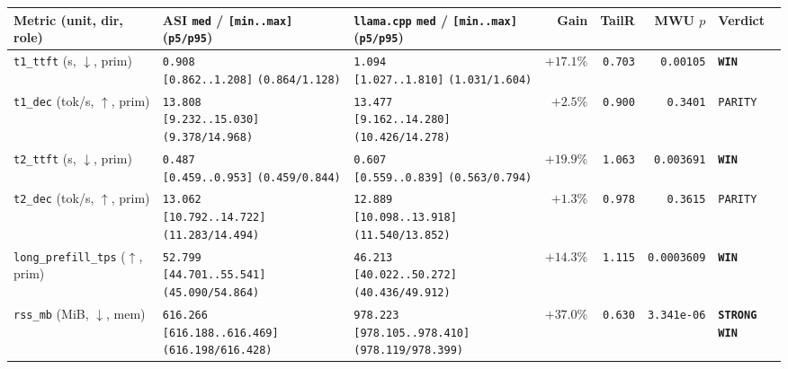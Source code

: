 \documentclass[11pt,a4paper]{article}
\begin{document}
\begin{table}[h]
\centering
\footnotesize
\setlength{\tabcolsep}{4pt}
\begin{tabular}{@{}lllrrrl@{}}
\toprule
Metric (unit, dir, role) & ASI \texttt{med} / \texttt{[min..max]} (\texttt{p5/p95}) & \texttt{llama.cpp} \texttt{med} / \texttt{[min..max]} (\texttt{p5/p95}) & Gain & TailR & MWU $p$ & Verdict \\
\midrule
\texttt{t1\_ttft} (s, $\downarrow$, prim) & \shortstack[l]{\texttt{0.908}\\\scriptsize\texttt{[0.862..1.208]} \texttt{(0.864/1.128)}} & \shortstack[l]{\texttt{1.094}\\\scriptsize\texttt{[1.027..1.810]} \texttt{(1.031/1.604)}} & $+17.1\%$ & \texttt{0.703} & \texttt{0.00105} & \textbf{\texttt{WIN}} \\
\texttt{t1\_dec} (tok/s, $\uparrow$, prim) & \shortstack[l]{\texttt{13.808}\\\scriptsize\texttt{[9.232..15.030]} \texttt{(9.378/14.968)}} & \shortstack[l]{\texttt{13.477}\\\scriptsize\texttt{[9.162..14.280]} \texttt{(10.426/14.278)}} & $+2.5\%$ & \texttt{0.900} & \texttt{0.3401} & \texttt{PARITY} \\
\texttt{t2\_ttft} (s, $\downarrow$, prim) & \shortstack[l]{\texttt{0.487}\\\scriptsize\texttt{[0.459..0.953]} \texttt{(0.459/0.844)}} & \shortstack[l]{\texttt{0.607}\\\scriptsize\texttt{[0.559..0.839]} \texttt{(0.563/0.794)}} & $+19.9\%$ & \texttt{1.063} & \texttt{0.003691} & \textbf{\texttt{WIN}} \\
\texttt{t2\_dec} (tok/s, $\uparrow$, prim) & \shortstack[l]{\texttt{13.062}\\\scriptsize\texttt{[10.792..14.722]} \texttt{(11.283/14.494)}} & \shortstack[l]{\texttt{12.889}\\\scriptsize\texttt{[10.098..13.918]} \texttt{(11.540/13.852)}} & $+1.3\%$ & \texttt{0.978} & \texttt{0.3615} & \texttt{PARITY} \\
\texttt{long\_prefill\_tps} ($\uparrow$, prim) & \shortstack[l]{\texttt{52.799}\\\scriptsize\texttt{[44.701..55.541]} \texttt{(45.090/54.864)}} & \shortstack[l]{\texttt{46.213}\\\scriptsize\texttt{[40.022..50.272]} \texttt{(40.436/49.912)}} & $+14.3\%$ & \texttt{1.115} & \texttt{0.0003609} & \textbf{\texttt{WIN}} \\
\texttt{rss\_mb} (MiB, $\downarrow$, mem) & \shortstack[l]{\texttt{616.266}\\\scriptsize\texttt{[616.188..616.469]} \texttt{(616.198/616.428)}} & \shortstack[l]{\texttt{978.223}\\\scriptsize\texttt{[978.105..978.410]} \texttt{(978.119/978.399)}} & $+37.0\%$ & \texttt{0.630} & \texttt{3.341e-06} & \textbf{\texttt{STRONG WIN}} \\

\end{tabular}
\end{table}
\end{document}
